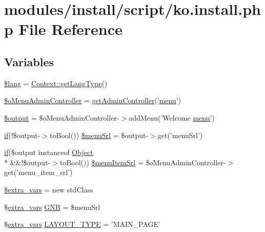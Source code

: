 \hypertarget{ko_8install_8php}{\section{modules/install/script/ko.install.\+php File Reference}
\label{ko_8install_8php}
}
\subsection*{Variables}
\begin{DoxyCompactItemize}
\item 
\hyperlink{ko_8install_8php_a7714b111b644017933931ec69a154102}{\$lang} = \hyperlink{classContext_ae75d6f4064d09e48d0d76614b6997e29}{Context\+::get\+Lang\+Type}()
\item 
\hyperlink{ko_8install_8php_a9062530c3b03479ca4530daee1c18887}{\$o\+Menu\+Admin\+Controller} = \hyperlink{func_8inc_8php_a2f7ca88a5226536aca3b2f5682bd7b2d}{get\+Admin\+Controller}('\hyperlink{classmenu}{menu}')
\item 
\hyperlink{ko_8install_8php_a73004ce9cd673c1bfafd1dc351134797}{\$output} = \$o\+Menu\+Admin\+Controller-\/$>$add\+Menu('Welcome \hyperlink{classmenu}{menu}')
\item 
\hyperlink{point__level__icon_8addon_8php_a29031816e50a8f742422e671b2bef9b2}{if}(!\$output-\/$>$to\+Bool()) \hyperlink{ko_8install_8php_abb9a711d32f19d7aff02c8501ad6fb55}{\$menu\+Srl} = \$output-\/$>$get('menu\+Srl')
\item 
\hyperlink{point__level__icon_8addon_8php_a29031816e50a8f742422e671b2bef9b2}{if}(\$output instanceof \hyperlink{classObject}{Object} \\*
\&\&!\$output-\/$>$to\+Bool()) \hyperlink{ko_8install_8php_a874928b6d7b44487718f1ede4a9f6ffe}{\$menu\+Item\+Srl} = \$o\+Menu\+Admin\+Controller-\/$>$get('menu\+\_\+item\+\_\+srl')
\item 
\hyperlink{ko_8install_8php_ae9f3d13d48d464400201d7ec024d3a45}{\$extra\+\_\+vars} = new std\+Class
\item 
\$\hyperlink{ko_8install_8php_ae1dcb37fc34a8f312d2e6abd6f806743}{extra\+\_\+vars} \hyperlink{ko_8install_8php_a9b1716b68fc04f3492448f38148dcbf5}{G\+N\+B} = \$menu\+Srl
\item 
\$\hyperlink{ko_8install_8php_ae1dcb37fc34a8f312d2e6abd6f806743}{extra\+\_\+vars} \hyperlink{ko_8install_8php_a559e719d2ff17f12b8fba72773e6601d}{L\+A\+Y\+O\+U\+T\+\_\+\+T\+Y\+P\+E} = 'M\+A\+I\+N\+\_\+\+P\+A\+G\+E'
\item 

\end{DoxyCompactItemize}
